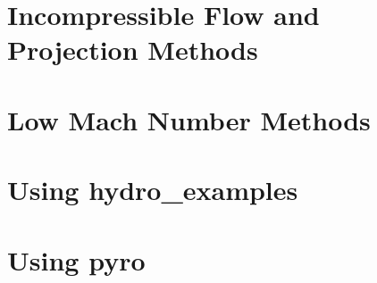 \documentclass[11pt]{book}
\newcommand{\pyro}{{\sf pyro}}
\newcommand{\hydroex}{{\sf hydro\_examples}}
\begin{document}
\chapter{Incompressible Flow and Projection Methods}



\chapter{Low Mach Number Methods}





\appendix

\chapter{Using \hydroex}



\chapter{Using \pyro}





\backmatter




\end{document}
